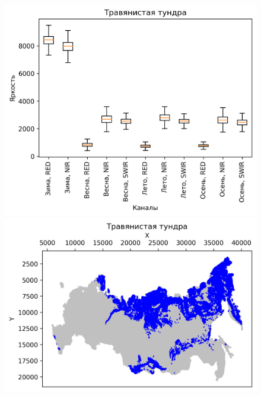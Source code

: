 \documentclass[14pt, a4paper, oneside]{extarticle}
\begin{document}
\begin{figure}[H]
    \centering
    \includegraphics[]{class-17-boxplot}
    \includegraphics[]{class-17-map}
\end{figure}
\end{document}
